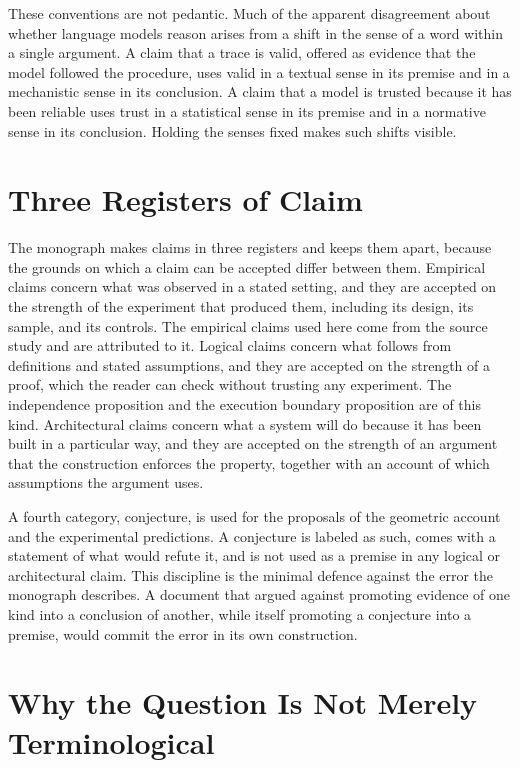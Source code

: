 These conventions are not pedantic. Much of the apparent disagreement about whether language models reason arises from a shift in the sense of a word within a single argument. A claim that a trace is valid, offered as evidence that the model followed the procedure, uses valid in a textual sense in its premise and in a mechanistic sense in its conclusion. A claim that a model is trusted because it has been reliable uses trust in a statistical sense in its premise and in a normative sense in its conclusion. Holding the senses fixed makes such shifts visible.

\section{Three Registers of Claim}

The monograph makes claims in three registers and keeps them apart, because the grounds on which a claim can be accepted differ between them. Empirical claims concern what was observed in a stated setting, and they are accepted on the strength of the experiment that produced them, including its design, its sample, and its controls. The empirical claims used here come from the source study and are attributed to it. Logical claims concern what follows from definitions and stated assumptions, and they are accepted on the strength of a proof, which the reader can check without trusting any experiment. The independence proposition and the execution boundary proposition are of this kind. Architectural claims concern what a system will do because it has been built in a particular way, and they are accepted on the strength of an argument that the construction enforces the property, together with an account of which assumptions the argument uses.

A fourth category, conjecture, is used for the proposals of the geometric account and the experimental predictions. A conjecture is labeled as such, comes with a statement of what would refute it, and is not used as a premise in any logical or architectural claim. This discipline is the minimal defence against the error the monograph describes. A document that argued against promoting evidence of one kind into a conclusion of another, while itself promoting a conjecture into a premise, would commit the error in its own construction.

\section{Why the Question Is Not Merely Terminological}

